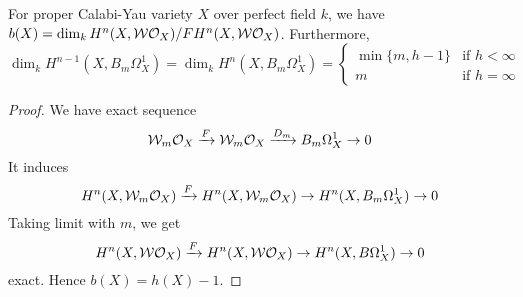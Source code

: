 \documentclass[11pt,a4paper]{scmsnotes}
\begin{document}
\begin{seccor}
For proper Calabi-Yau variety $X$ over perfect field $k$, we have $b(X)= \dim_k H^n(X,\mathcal{W} \mathcal{O}_{X})/F H^n(X,\mathcal{W}\mathcal{O}_{X})$. Furthermore,
\[
\dim_k H^{n-1}(X,B_m \Omega_X^1)=\dim_k H^n(X,B_m \Omega_X^1) = \begin{cases}
\min \{m,h-1\}& \text{if } h < \infty\\
m& \text{if } h = \infty
\end{cases}
\]	
\end{seccor}

\begin{proof}
	We have exact sequence
	\[
	\mathcal{W}_m \mathcal{O}_{X} \xrightarrow{F} \mathcal{W}_m \mathcal{O}_{X} \xrightarrow{D_m} B_m \Omega_X^1 \to 0
	\]
	It induces 
	\[
	H^n(X,\mathcal{W}_m \mathcal{O}_{X}) \xrightarrow{F} H^n(X,\mathcal{W}_m \mathcal{O}_{X}) \to H^n(X,B_m \Omega_X^1) \to 0
	\]
	Taking limit with $m$, we get 
	\[
	H^n(X, \mathcal{W} \mathcal{O}_{X}) \xrightarrow{F} H^n(X,\mathcal{W} \mathcal{O}_{X}) \to H^n(X, B \Omega_X^1) \to 0
	\]
	exact. Hence $b(X)= h(X)-1$. 
\end{proof}

\end{document}
